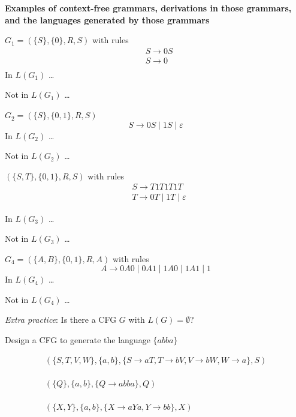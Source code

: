 \documentclass[12pt, oneside]{article}
\begin{document}
{\bf Examples of context-free grammars, derivations in those grammars, and the languages generated by those grammars}
  
$G_1 =  (\{S\}, \{0\}, R, S)$ with rules
  \begin{align*}
    &S \to 0S\\
    &S \to 0\\
  \end{align*}
  In  $L(G_1)$ \ldots 
  
  \vspace{110pt}
  
  Not in $L(G_1)$ \ldots 

  \vspace{110pt}


  $G_2 =  (\{S\}, \{0,1\}, R, S)$
  \[
  S \to 0S \mid 1S \mid \varepsilon
  \]
  In  $L(G_2)$ \ldots 
  
  \vspace{110pt}
  
  Not in $L(G_2)$ \ldots 

  \vspace{110pt}

  $(\{S, T\}, \{0, 1\}, R, S)$ with  rules
  \begin{align*}
  &S \to T1T1T1T \\
  &T \to  0T \mid 1T \mid \varepsilon
  \end{align*}

  In  $L(G_3)$ \ldots 
  
  \vspace{110pt}
  
  Not in $L(G_3)$ \ldots 

  \vspace{110pt}


  $G_4 =  (\{A, B\}, \{0, 1\}, R, A)$ with rules
  \[
    A \to 0A0 \mid  0A1 \mid 1A0  \mid 1A1 \mid  1
  \]
  In  $L(G_4)$ \ldots 
  
  \vspace{110pt}
  
  Not in $L(G_4)$ \ldots 

  \vspace{110pt}

  
{\it Extra practice}: Is there a CFG $G$ with $L(G) = \emptyset$?

  \newpage
  
  Design a CFG to generate the  language $\{abba\}$
  
  \begin{align*}
  & ( \{ S, T, V, W\}, \{a,b\}, \{ S \to aT, T \to bV, V \to bW, W \to a\}, S)\\
  & \\ 
  & \\ 
  & \\ 
  & ( \{ Q \}, \{a,b\}, \{Q \to abba\}, Q) \\
  & \\ 
  & \\ 
  & \\
  & ( \{ X,Y \}, \{a,b\}, \{X \to aYa, Y \to bb\}, X) 
  & \\ 
  & \\ 
  \end{align*} 
\end{document}
